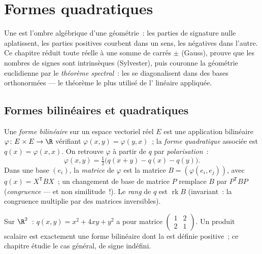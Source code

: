 \chapter{Formes quadratiques}\label{ch:b2:quadratic}

Une  est l'ombre algébrique d'une géométrie~: les
parties de signature nulle aplatissent, les parties positives
courbent dans un sens, les négatives dans l'autre. Ce chapitre
réduit toute  réelle à une somme de carrés $\pm$
(Gauss), prouve que les nombres de signes sont intrinsèques
(Sylvester), puis couronne la géométrie euclidienne par le
\emph{théorème spectral}~: les  se
diagonalisent dans des bases orthonormées --- le théorème le plus
utilisé de l' linéaire appliquée.

\section{Formes bilinéaires et quadratiques}

\begin{definition}\label{def:b2:quadratic:def}
Une \emph{forme bilinéaire } sur un espace vectoriel réel
$E$ est une application bilinéaire $\varphi \colon E \times E \to
\R$ vérifiant $\varphi(x, y) = \varphi(y, x)$~; la \emph{forme
quadratique} associée est $q(x) =
\varphi(x, x)$. On retrouve $\varphi$ à partir de $q$ par
\emph{polarisation}~:
\[
\varphi(x, y) = \tfrac12\bigl(q(x + y) - q(x) - q(y)\bigr).
\]
Dans une base $(e_i)$, la \emph{matrice} de $\varphi$ est la matrice
 $B = (\varphi(e_i, e_j))$, avec $q(x) = X^{\mathsf T} B
X$~; un changement de base de matrice $P$ remplace $B$ par
$P^{\mathsf T} B P$ (\emph{congruence}
--- et non similitude~!). Le \emph{rang} de $q$ est
$\operatorname{rk} B$ (invariant~: la congruence multiplie par des
matrices inversibles).
\end{definition}

\begin{example}
Sur $\R^2$~: $q(x, y) = x^2 + 4xy + y^2$ a pour matrice
$\begin{pmatrix} 1 & 2\\ 2 & 1\end{pmatrix}$. Un produit scalaire
est exactement une forme bilinéaire  dont la  est définie positive~; ce chapitre étudie le cas
général, de signe indéfini.
\end{example}

